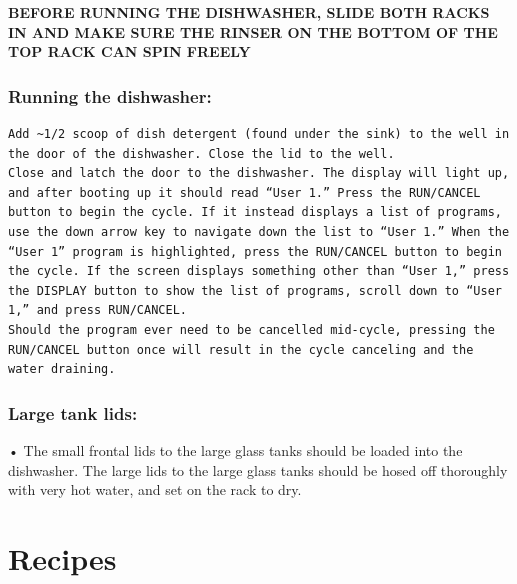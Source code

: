 \documentclass[
]{book}
\begin{document}
\textbf{BEFORE RUNNING THE DISHWASHER, SLIDE BOTH RACKS IN AND MAKE SURE THE RINSER ON THE BOTTOM OF THE TOP RACK CAN SPIN FREELY}

\hypertarget{running-the-dishwasher}{%
\subsection{Running the dishwasher:}\label{running-the-dishwasher}}

\begin{verbatim}
Add ~1/2 scoop of dish detergent (found under the sink) to the well in the door of the dishwasher. Close the lid to the well.
Close and latch the door to the dishwasher. The display will light up, and after booting up it should read “User 1.” Press the RUN/CANCEL button to begin the cycle. If it instead displays a list of programs, use the down arrow key to navigate down the list to “User 1.” When the “User 1” program is highlighted, press the RUN/CANCEL button to begin the cycle. If the screen displays something other than “User 1,” press the DISPLAY button to show the list of programs, scroll down to “User 1,” and press RUN/CANCEL.  
Should the program ever need to be cancelled mid-cycle, pressing the RUN/CANCEL button once will result in the cycle canceling and the water draining. 
\end{verbatim}

\hypertarget{large-tank-lids}{%
\subsection{Large tank lids:}\label{large-tank-lids}}

• The small frontal lids to the large glass tanks should be loaded into the dishwasher. The large lids to the large glass tanks should be hosed off thoroughly with very hot water, and set on the rack to dry.

\hypertarget{recipes}{%
\chapter{Recipes}\label{recipes}}
\end{document}
